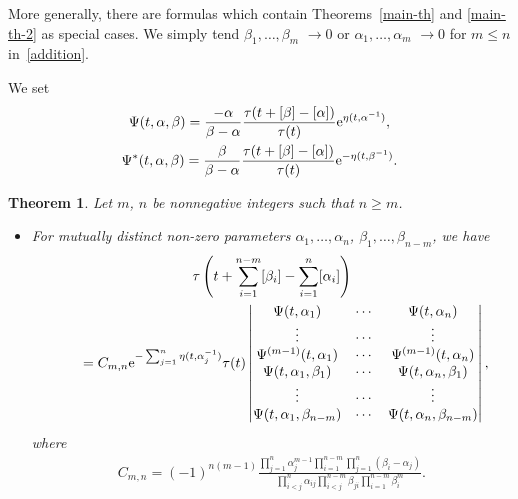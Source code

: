 \documentclass[10pt,a4paper]{amsart}
\numberwithin{equation}{section}
\newtheorem{Theorem}{Theorem}[section]
\theoremstyle{definition}
\begin{document}
More generally, there are formulas which contain Theorems~\ref{main-th} and \ref{main-th-2} as
special cases. We simply tend $\beta_1,\dots ,\beta_m$ $\to 0$ or $\alpha_1,\dots ,\alpha_m$ $\to 0$ for $m\leq n$ in~\eqref{addition}.

We set
\begin{gather}%
\Psi(t,\alpha,\beta)
=
\frac{-\alpha}{\beta-\alpha}\frac{\tau(t+[\beta]-[\alpha])}{\tau(t)}
{\rm e}^{\eta(t,\alpha^{-1})},
\label{psi-beta-alpha}
\\
\Psi^\ast(t,\alpha,\beta)
=
\frac{\beta}{\beta-\alpha}\frac{\tau(t+[\beta]-[\alpha])}{\tau(t)}
{\rm e}^{-\eta(t,\beta^{-1})}.\nonumber
\end{gather}


\begin{Theorem}\label{main-th-3} Let $m$, $n$ be nonnegative integers such that $n\geq m$.
\begin{itemize}\itemsep=0pt
\item[$(i)$] For mutually distinct non-zero parameters $\alpha_1,\dots ,\alpha_n$, $\beta_1,\dots , \beta_{n-m}$, we have
\begin{gather*}
\tau\left(t+\sum_{i=1}^{n-m}[\beta_i]-\sum_{i=1}^n[\alpha_i]\right)\\
\qquad
=
C_{m,n}
{\rm e}^{-\sum_{j=1}^n\eta(t,\alpha_j^{-1})}
\tau(t)
\left|
\begin{matrix}
\Psi(t,\alpha_1)&\cdots&\Psi(t,\alpha_n)\\
\vdots&\cdots&\vdots\\
\Psi^{(m-1)}(t,\alpha_1)&\cdots&\Psi^{(m-1)}(t,\alpha_n)\\
\Psi(t,\alpha_1,\beta_1)&\cdots&\Psi(t,\alpha_n,\beta_1)\\
\vdots&\cdots&\vdots\\
\Psi(t,\alpha_1,\beta_{n-m})&\cdots&\Psi(t,\alpha_n,\beta_{n-m})\\
\end{matrix}
\right|,
\end{gather*}
where
\begin{gather*}
C_{m,n}=(-1)^{n(m-1)}\frac{\prod_{j=1}^n\alpha_j^{m-1}\prod_{i=1}^{n-m}\prod_{j=1}^n(\beta_i-\alpha_j)}
{\prod_{i<j}^n\alpha_{ij}\prod_{i<j}^{n-m}\beta_{ji}\prod_{i=1}^{n-m}\beta_i^m}.
\end{gather*}


\end{itemize}
\end{Theorem}
\end{document}
